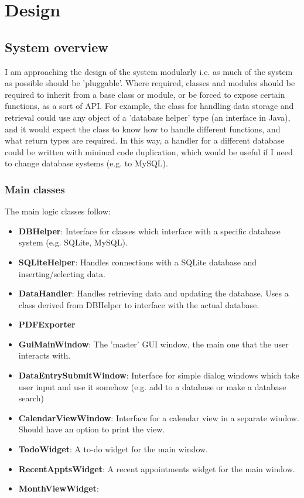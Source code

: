 \section{Design}
\subsection{System overview}

I am approaching the design of the system modularly i.e. as much of the system
as possible should be 'pluggable'. Where required, classes and modules should be
required to inherit from a base class or module, or be forced to expose certain
functions, as a sort of API. For example, the class for handling data storage
and retrieval could use any object of a 'database helper' type (an interface in
Java), and it would expect the class to know how to handle different functions,
and what return types are required. In this way, a handler for a different
database could be written with minimal code duplication, which would be useful
if I need to change database systems (e.g. to MySQL).

\subsubsection{Main classes}

\newcommand{\classitem}[1]{\item \textbf{#1}}

The main logic classes follow:

\begin{itemize}
    \classitem{DBHelper}: Interface for classes which interface with a specific
        database system (e.g. SQLite, MySQL).
    \classitem{SQLiteHelper}: Handles connections with a SQLite database and
        inserting/selecting data.
    \classitem{DataHandler}: Handles retrieving data and updating the
        database. Uses a class derived from DBHelper to interface with the
        actual database.
    \classitem{PDFExporter}
\end{itemize}


\begin{itemize}
    \classitem{GuiMainWindow}: The 'master' GUI window, the main one that the
        user interacts with.
    \classitem{DataEntrySubmitWindow}: Interface for simple dialog windows
        which take user input and use it somehow (e.g. add to a database or make
        a database search)
    \classitem{CalendarViewWindow}: Interface for a calendar view in a separate
        window. Should have an option to print the view.
    \classitem{TodoWidget}: A to-do widget for the main window.
    \classitem{RecentApptsWidget}: A recent appointments widget for the main
    window.
    \classitem{MonthViewWidget}:
\end{itemize}



